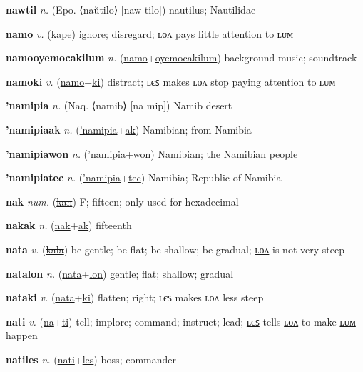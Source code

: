 \textbf{\hypertarget{nawtil}{nawtil}} \textit{n.} (Epo. ⟨naŭtilo⟩ [nawˈtilo])
nautilus; Nautilidae

\textbf{\hypertarget{namo}{namo}} \textit{v.} (\hyperlink{kape}{\sout{kape}})
ignore; disregard; ʟᴏᴧ pays little attention to ʟᴜᴍ

\textbf{\hypertarget{namooyemocakilum}{namooyemocakilum}} \textit{n.} (\hyperlink{namo}{namo}+\allowbreak \hyperlink{oyemocakilum}{oyemocakilum})
background music; soundtrack

\textbf{\hypertarget{namoki}{namoki}} \textit{v.} (\hyperlink{namo}{namo}+\allowbreak \hyperlink{ki}{ki})
distract; ʟєꜱ makes ʟᴏᴧ stop paying attention to ʟᴜᴍ

\textbf{\hypertarget{'namipia}{'namipia}} \textit{n.} (Naq. ⟨namib⟩ [naˈmip])
Namib desert

\textbf{\hypertarget{'namipiaak}{'namipiaak}} \textit{n.} (\hyperlink{'namipia}{'namipia}+\allowbreak \hyperlink{ak}{ak})
Namibian; from Namibia

\textbf{\hypertarget{'namipiawon}{'namipiawon}} \textit{n.} (\hyperlink{'namipia}{'namipia}+\allowbreak \hyperlink{won}{won})
Namibian; the Namibian people

\textbf{\hypertarget{'namipiatec}{'namipiatec}} \textit{n.} (\hyperlink{'namipia}{'namipia}+\allowbreak \hyperlink{tec}{tec})
Namibia; Republic of Namibia

\textbf{\hypertarget{nak}{nak}} \textit{num.} (\hyperlink{kan}{\sout{kan}})
F; fifteen; only used for hexadecimal

\textbf{\hypertarget{nakak}{nakak}} \textit{n.} (\hyperlink{nak}{nak}+\allowbreak \hyperlink{ak}{ak})
fifteenth

\textbf{\hypertarget{nata}{nata}} \textit{v.} (\hyperlink{kala}{\sout{kala}})
be gentle; be flat; be shallow; be gradual; \hyperlink{natalon}{ʟᴏᴧ} is not very steep

\textbf{\hypertarget{natalon}{natalon}} \textit{n.} (\hyperlink{nata}{nata}+\allowbreak \hyperlink{lon}{lon})
gentle; flat; shallow; gradual

\textbf{\hypertarget{nataki}{nataki}} \textit{v.} (\hyperlink{nata}{nata}+\allowbreak \hyperlink{ki}{ki})
flatten; right; ʟєꜱ makes ʟᴏᴧ less steep

\textbf{\hypertarget{nati}{nati}} \textit{v.} (\hyperlink{na}{na}+\allowbreak \hyperlink{ti}{ti})
tell; implore; command; instruct; lead; \hyperlink{natiles}{ʟєꜱ} tells \hyperlink{natilon}{ʟᴏᴧ} to make \hyperlink{natilum}{ʟᴜᴍ} happen

\textbf{\hypertarget{natiles}{natiles}} \textit{n.} (\hyperlink{nati}{nati}+\allowbreak \hyperlink{les}{les})
boss; commander

